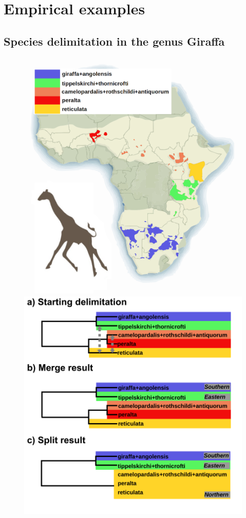 \documentclass{article1}
\begin{document}
\section{Empirical examples}

\subsection{Species delimitation in the genus Giraffa}

\begin{figure}[t]
    \centering %
    \includegraphics[scale=0.50]{figs/Giraffe/giraffe_fig} %
    \includegraphics[scale=0.50]{figs/Giraffe/giraffe_result}  %
    

\end{figure}
\end{document}
